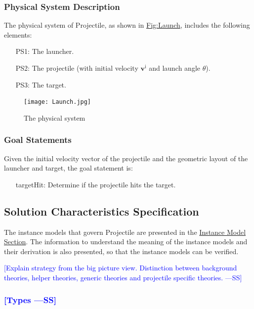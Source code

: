 \documentclass[12pt]{article}
\newcommand{\authornote}[3]{\textcolor{#1}{[#3 ---#2]}}
\newcommand{\authornote}[3]{}
\newcommand{\wss}[1]{\authornote{blue}{SS}{#1}}
\begin{document}
\subsubsection{Physical System Description}
\label{Sec:PhysSyst}
The physical system of Projectile, as shown in \hyperref[Figure:Launch]{Fig:Launch}, includes the following elements:

\begin{itemize}
\item[PS1:]{The launcher.}
\item[PS2:]{The projectile (with initial velocity ${\symbf{v}^{\text{i}}}$ and launch angle $θ$).}
\item[PS3:]{The target.}
\end{itemize}
\begin{figure}
\begin{center}
\texttt{[image: Launch.jpg]}
\caption{The physical system}
\label{Figure:Launch}
\end{center}
\end{figure}
\subsubsection{Goal Statements}
\label{Sec:GoalStmt}
Given the initial velocity vector of the projectile and the geometric layout of the launcher and target, the goal statement is:

\begin{itemize} \item[targetHit:\phantomsection\label{targetHit}]{Determine if
the projectile hits the target.} \end{itemize} 

\subsection{Solution Characteristics Specification} \label{Sec:SolCharSpec} The instance models that
govern Projectile are presented in the \hyperref[Sec:IMs]{Instance Model
Section}. The information to understand the meaning of the instance models and
their derivation is also presented, so that the instance models can be verified.

\wss{Explain strategy from the big picture view.  Distinction between background
theories, helper theories, generic theories and projectile specific theories.}

\subsubsection{\wss{Types}}
\end{document}
